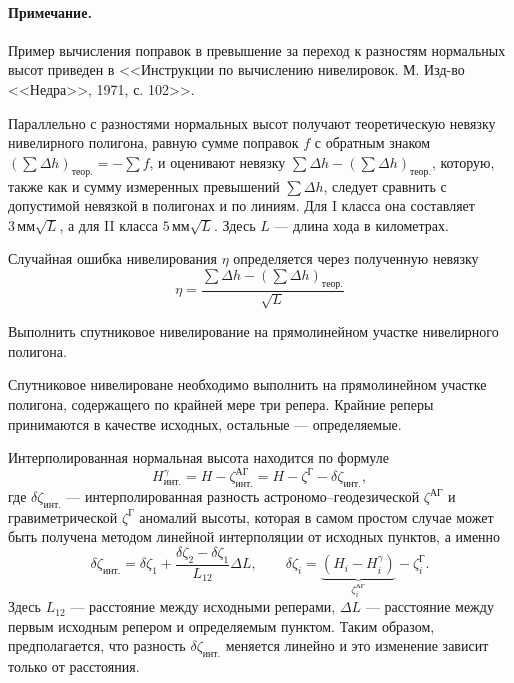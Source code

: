 \documentclass[11pt, a4paper,addpoints]{exam}
\theoremstyle{remark}
\newcommand{\zetaag}{\zeta^{\textrm{АГ}}}
\newcommand{\zetag}{\zeta^{\textrm{Г}}}
\begin{document}
\begin{questions}
    \paragraph{Примечание.} Пример вычисления поправок в превышение за переход к разностям нормальных высот приведен в
    <<Инструкции по вычислению нивелировок. М. Изд-во <<Недра>>, 1971, с. 102>>.

    Параллельно с разностями нормальных высот получают теоретическую невязку нивелирного полигона,
    равную сумме поправок $f$ с обратным знаком $(\sum\Delta h)_\textrm{теор.} =  -\sum f$, и
    оценивают невязку $\sum\Delta h - (\sum\Delta h)_\textrm{теор.}$, которую, также как и сумму
    измеренных превышений $\sum\Delta h$, следует сравнить с 
    допустимой невязкой в полигонах и по линиям. Для I класса она составляет 
    $3\,\textrm{мм}\sqrt{L}$, 
    а для II класса $5\,\textrm{мм}\sqrt{L}$. Здесь $L$ --- длина хода в километрах.

    Случайная ошибка нивелирования $\eta$ определяется через полученную невязку
    \begin{equation*}
        \eta = \dfrac{\sum\Delta h - (\sum\Delta h)_\textrm{теор.}}{\sqrt{L}}
    \end{equation*}

     \question Выполнить спутниковое нивелирование на прямолинейном участке нивелирного полигона.

    Спутниковое нивелироване необходимо выполнить на прямолинейном участке полигона, содержащего по
    крайней мере три репера. Крайние реперы принимаются в качестве исходных, остальные ---
    определяемые.

    Интерполированная нормальная высота находится по формуле
    \begin{equation*}
        H_{\textrm{инт.}}^\gamma = H - \zetaag_{\textrm{инт.}} = H - \zetag -
        \delta\zeta_{\textrm{инт.}},
    \end{equation*}
    где $\delta\zeta_{\textrm{инт.}}$ --- интерполированная разность  астрономо--геодезической
    $\zetaag$ и
    гравиметрической $\zetag$ аномалий высоты, которая в самом простом случае 
    может быть получена методом линейной интерполяции от исходных пунктов, а именно
    \begin{equation*}
        \delta\zeta_{\textrm{инт.}} =
        \delta\zeta_1 + \dfrac{\delta\zeta_2 - \delta\zeta_1}{L_{12}} \Delta L,\qquad 
        \delta\zeta_i = \underbrace{\left( H_i - H^\gamma_i \right)}_{\zetaag_i} - \zetag_i.
    \end{equation*}
    Здесь $L_{12}$ --- расстояние между исходными реперами, $\Delta L$ --- расстояние между первым исходным
    репером и определяемым пунктом. Таким образом, предполагается, что разность $\delta\zeta_{\textrm{инт.}}$
    меняется линейно и это изменение зависит только от расстояния.


\end{questions}
\end{document}
